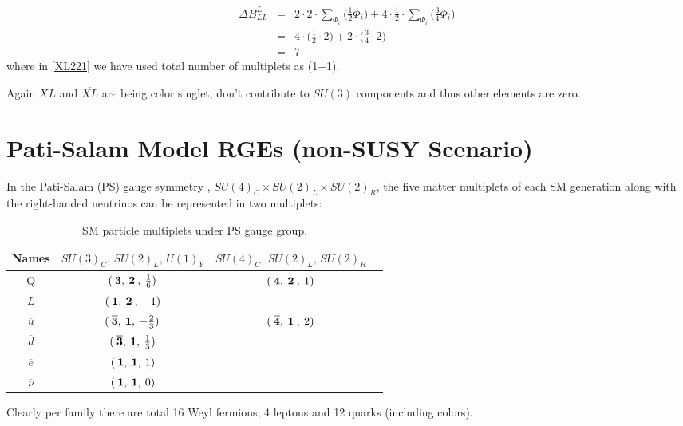 \documentclass[11pt,prd,superscriptaddress,nofootinbib]{revtex4-1}
\def\sbar{\overline}
\numberwithin{equation}{section}
\newcommand{\bea}{\begin{eqnarray}}
\newcommand{\eea}{\end{eqnarray}}
\begin{document}
\bea \label{XL22}
\Delta B_{LL}^L &=& 2\cdot 2\cdot\sum_{\Phi_i}\big (\frac{1}{2}{\Phi_i} \big)+4\cdot\frac{1}{2}\cdot\sum_{\Phi_i}\big (\frac{3}{4}{\Phi_i} \big)~~\nonumber\\ 
 &=& 4\cdot\bigg(\frac{1}{2}\cdot 2\bigg)+2\cdot\bigg(\frac{3}{4}\cdot 2\bigg) \label{XL221}\\  
 &=& \boxed{7}
\eea
where in \ref{XL221} we have used total number of multiplets as (1+1).

\noindent
Again $XL$ and $\overline{XL}$ are being color singlet, don't contribute to $SU(3)$ components and thus other elements are zero.



\section{Pati-Salam Model RGEs (non-SUSY Scenario)}
\label{PSRGEs}

In the Pati-Salam (PS) gauge symmetry \cite{Pati:1974yy}, $SU(4)_C\times SU(2)_L\times SU(2)_R$, the five matter multiplets of each SM generation along with the right-handed neutrinos can be represented in two multiplets:

\begin{table}[H]
\newlength{\mylen}
\settowidth{\mylen}{Names}
\begin{center}
\begin{tabular}{|c|c|c|c|}
\hline
Names & $SU(3)_C ,\, SU(2)_L ,\, U(1)_Y$ & $SU(4)_C ,\, SU(2)_L ,\, SU(2)_R$
\\  \hline\hline
Q & $(\>{\bf 3},\>{\bf 2}\>,\>{1\over 6})$ & \multirow{2}{*}{$(\>{\bf 4},\>{\bf 2}\>,\>{1})$}\\
 $L$&  $(\>{\bf 1},\>{\bf 2}\>,\>-1)$ &
\\  \hline
 $\sbar u$  & $(\>{\bf \overline 3},\> {\bf 1},\> -{2\over 3})$ &  \multirow{4}{*}{$(\>{\bf \overline 4},\>{\bf 1}\>,\>{2})$}
\\  $\sbar d$ & $(\>{\bf \overline 3},\> {\bf 1},\> {1\over 3})$ &  \\ 
$\sbar e$ & $(\>{\bf 1},\> {\bf 1},\>1)$ & \\ 
$\sbar \nu$ & $(\>{\bf 1},\> {\bf 1},\>0)$ & \\ \hline
\end{tabular}
\caption{SM particle multiplets under PS gauge group.\label{tab:PSparticle}}
\vspace{-0.6cm}
\end{center}
\end{table}
Clearly per family there are total 16 Weyl fermions, 4 leptons and 12 quarks (including colors). 
\end{document}
